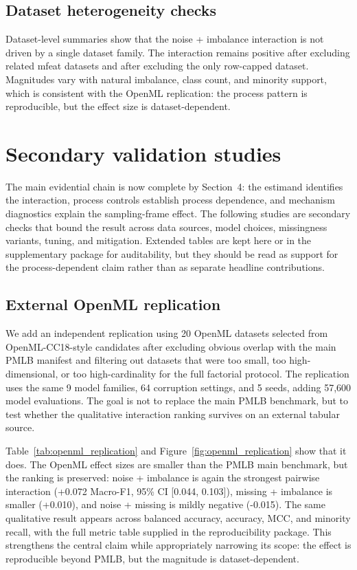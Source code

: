 \documentclass[preprint,12pt,number]{elsarticle}
\begin{document}
\subsection{Dataset heterogeneity checks}

Dataset-level summaries show that the noise + imbalance interaction is not driven by a single dataset family. The interaction remains positive after excluding related mfeat datasets and after excluding the only row-capped dataset. Magnitudes vary with natural imbalance, class count, and minority support, which is consistent with the OpenML replication: the process pattern is reproducible, but the effect size is dataset-dependent.

\section{Secondary validation studies}

The main evidential chain is now complete by Section~4: the estimand identifies the interaction, process controls establish process dependence, and mechanism diagnostics explain the sampling-frame effect. The following studies are secondary checks that bound the result across data sources, model choices, missingness variants, tuning, and mitigation. Extended tables are kept here or in the supplementary package for auditability, but they should be read as support for the process-dependent claim rather than as separate headline contributions.

\subsection{External OpenML replication}
\label{sec:external_replication}

We add an independent replication using 20 OpenML datasets selected from OpenML-CC18-style candidates after excluding obvious overlap with the main PMLB manifest and filtering out datasets that were too small, too high-dimensional, or too high-cardinality for the full factorial protocol. The replication uses the same 9 model families, 64 corruption settings, and 5 seeds, adding 57,600 model evaluations. The goal is not to replace the main PMLB benchmark, but to test whether the qualitative interaction ranking survives on an external tabular source.

Table~\ref{tab:openml_replication} and Figure~\ref{fig:openml_replication} show that it does. The OpenML effect sizes are smaller than the PMLB main benchmark, but the ranking is preserved: noise + imbalance is again the strongest pairwise interaction (+0.072 Macro-F1, 95\% CI [0.044, 0.103]), missing + imbalance is smaller (+0.010), and noise + missing is mildly negative (-0.015). The same qualitative result appears across balanced accuracy, accuracy, MCC, and minority recall, with the full metric table supplied in the reproducibility package. This strengthens the central claim while appropriately narrowing its scope: the effect is reproducible beyond PMLB, but the magnitude is dataset-dependent.
\end{document}
